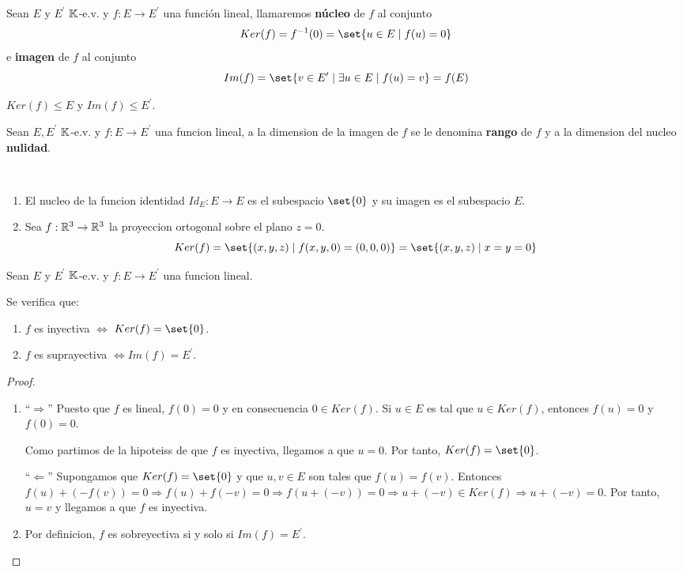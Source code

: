 \begin{definition}
	Sean \(E \) y \(E^\prime  \) \(\mathbb{K}\)-e.v. y \(f \colon E \to E^\prime \) una función lineal, llamaremos \textbf{núcleo} de \(f \) al conjunto
	\[
		Ker(f) = f^{-1} ({0}) = \set{u \in E \mid f(u) = 0 }
	\]
	e \textbf{imagen} de \(f \) al conjunto
	\[
		Im(f) = \set{v \in E^\prime \mid \exists u \in E \mid f(u) = v } = f(E)
	\]
\end{definition}
\begin{remark}
	\(Ker(f) \leq E \) y \(Im(f) \leq E^\prime \).
\end{remark}

\begin{definition}
	Sean \(E, E^\prime  \) \(\mathbb{K} \)-e.v. y \(f \colon E \to E^\prime \) una funcion lineal, a la dimension de la imagen de \(f \) se le denomina \textbf{rango} de \(f \) y a la dimension del nucleo \textbf{nulidad}.
\end{definition}
\begin{example}
	~\begin{enumerate}
		\item El nucleo de la funcion identidad \(Id_E \colon E \to E \) es el subespacio \(\set{0}\) y su imagen es el subespacio \(E \).
		\item Sea \(f: \mathbb{R}^{3} \to \mathbb{R}^{3 } \) la proyeccion ortogonal sobre el plano \(z = 0 \).
		      \[
			      Ker(f) = \set{(x,y,z) \mid f(x,y,0) = (0,0,0)} = \set{(x,y,z) \mid x = y = 0}
		      \]
	\end{enumerate}
\end{example}

\begin{theorem}
	Sean \(E \) y \(E^\prime  \) \(\mathbb{K}\)-e.v. y \(f \colon E \to E^\prime  \) una funcion lineal.

	Se verifica que:
	\begin{enumerate}
		\item \(f \) es inyectiva \(\iff  \) \(Ker(f) = \set{0 }\).
		\item \(f \) es suprayectiva \(\iff Im(f) = E^\prime \).
	\end{enumerate}
\end{theorem}
\begin{proof}
	\begin{enumerate}
		\item ``\(\Rightarrow \)'' Puesto que \(f \) es lineal, \(f(0) = 0 \) y en consecuencia \(0 \in Ker(f )\). Si \(u \in E \) es tal que \(u \in Ker(f )\), entonces \(f(u) = 0 \) y \(f(0) = 0 \).

		      Como partimos de la hipoteiss de que \(f \) es inyectiva, llegamos a que \(u = 0 \). Por tanto, \(Ker(f) = \set{0}\).

		      ``\(\Leftarrow \)'' Supongamos que \(Ker(f) = \set{0 }\) y que \(u,v \in E \) son tales que \(f(u) = f(v )\). Entonces \(f(u) + (-f(v)) = 0 \Rightarrow f(u) + f(-v) = 0 \Rightarrow f(u + (- v)) = 0 \Rightarrow u +(- v) \in Ker(f ) \Rightarrow u + (- v) = 0\). Por tanto, \(u = v \) y llegamos a que \(f \) es inyectiva.
		\item Por definicion, \(f \) es sobreyectiva si y solo si \(Im(f) = E^\prime \).
	\end{enumerate}
\end{proof}

